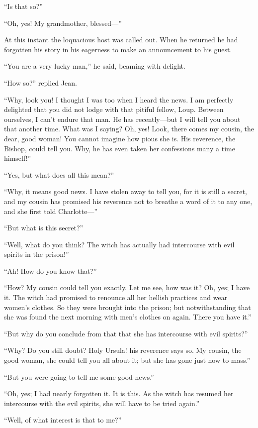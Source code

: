 ``Is that so?''

``Oh, yes! My grandmother, blessed---''

At this instant the loquacious host was called out. When he returned he
had forgotten his story in his eagerness to make an announcement to his
guest.

``You are a very lucky man,'' he said, beaming with delight.

``How so?'' replied Jean.

``Why, look you! I thought I was too when I heard the news. I am
perfectly delighted that you did not lodge with that pitiful fellow,
Loup. Between ourselves, I can't endure that man. He has recently---but
I will tell you about that another time. What was I saying? Oh, yes!
Look, there comes my cousin, the dear, good woman! You cannot imagine
how pious she is. His reverence, the Bishop, could tell you. Why, he has
even taken her confessions many a time himself!''

``Yes, but what does all this mean?''

``Why, it means good news. I have stolen away to tell you, for it is
still a secret, and my cousin has promised his reverence not to breathe
a word of it to any one, and she first told Charlotte---''

``But what is this secret?''

``Well, what do you think? The witch has actually had intercourse with
evil spirits in the prison!''

``Ah! How do you know that?''

``How? My cousin could tell you exactly. Let me see, how was it? Oh,
yes; I have it. The witch had promised to renounce all her hellish
practices and wear women's clothes. So they were brought into the
prison; but notwithstanding that she was found the next morning with
men's clothes on again. There you have it.''

``But why do you conclude from that that she has intercourse with evil
spirits?''

``Why? Do you still doubt? Holy Ursula! his reverence says so. My
cousin, the good woman, she could tell you all about it; but she has
gone just now to mass.''

``But you were going to tell me some good news.''

``Oh, yes; I had nearly forgotten it. It is this. As the witch has
resumed her intercourse with the evil spirits, she will have to be tried
again.''

``Well, of what interest is that to me?''

